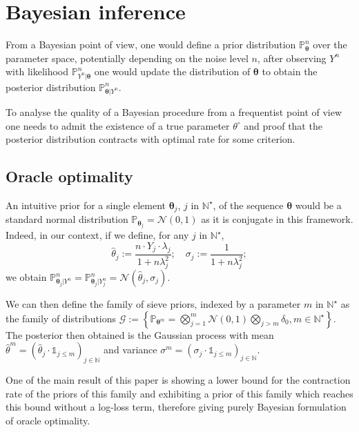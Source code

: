 \section{Bayesian inference}\label{3}
From a Bayesian point of view, one would define a prior distribution $\mathds{P}_{\boldsymbol{\theta}}^{n}$ over the parameter space, potentially depending on the noise level $n$, after observing $Y^{n}$ with likelihood $\mathds{P}_{Y^{n} \vert \boldsymbol{\theta}}^{n}$ one would update the distribution of $\boldsymbol{\theta}$ to obtain the posterior distribution $\mathds{P}_{\boldsymbol{\theta} \vert Y^{n}}^{n}$.

To analyse the quality of a Bayesian procedure from a frequentist point of view one needs to admit the existence of a true parameter $\theta^{\circ}$ and proof that the posterior distribution contracts with optimal rate for some criterion.

\subsection{Oracle optimality}\label{3.1}
An intuitive prior for a single element $\boldsymbol{\theta}_{j}$, $j$ in $\mathds{N}^{\star}$, of the sequence $\boldsymbol{\theta}$ would be a standard normal distribution $\mathds{P}_{\boldsymbol{\theta}_{j}} = \mathcal{N}(0, 1)$ as it is conjugate in this framework. Indeed, in our context, if we define, for any $j$ in $\mathds{N}^{\star}$,
\[\widehat{\theta}_{j} := \frac{n \cdot Y_{j} \cdot \lambda_{j}}{1 + n \lambda_{j}^{2}}; \quad \sigma_{j} := \frac{1}{1 + n \lambda_{j}^{2}};\]
we obtain $\mathds{P}_{\boldsymbol{\theta}_{j} \vert Y^{n}}^{n} = \mathds{P}_{\boldsymbol{\theta}_{j} \vert Y^{n}_{j}}^{n} = \mathcal{N}(\widehat{\theta}_{j}, \sigma_{j}).$

We can then define the family of sieve priors, indexed by a parameter $m$ in $\mathds{N}^{\star}$ as the family of distributions $\mathcal{G} := \left\{\mathds{P}_{\boldsymbol{\theta}^{m}} = \bigotimes\limits_{j = 1}^{m} \mathcal{N}(0, 1) \bigotimes\limits_{j > m} \delta_{0}, m \in \mathds{N}^{\star}\right\}$.
The posterior then obtained is the Gaussian process with mean $\widehat{\theta}^{m} = \left(\widehat{\theta}_{j} \cdot \mathds{1}_{j \leq m}\right)_{j \in \mathds{N}}$ and variance $\sigma^{m} = \left(\sigma_{j} \cdot \mathds{1}_{j \leq m}\right)_{j \in \mathds{N}}$.

One of the main result of this paper is showing a lower bound for the contraction rate of the priors of this family and exhibiting a prior of this family which reaches this bound without a log-loss term, therefore giving purely Bayesian formulation of oracle optimality.

